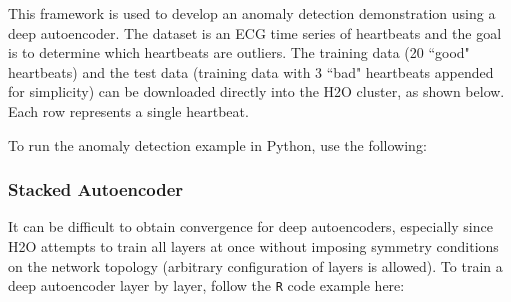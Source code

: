 {{This framework is used to develop an anomaly detection demonstration using a deep autoencoder. The dataset is an ECG time series of heartbeats and the goal is to determine which heartbeats are outliers. The training data (20 ``good" heartbeats) and the test data (training data with 3 ``bad" heartbeats appended for simplicity) can be downloaded directly into the H2O cluster, as shown below.  Each row represents a single heartbeat. 

%
%                              
%                              
%
%

\newpage
\waterExampleInR


\newpage

To run the anomaly detection example in Python, use the following:
 
\waterExampleInPython


\newpage
\subsubsection{Stacked Autoencoder}
It can be difficult to obtain convergence for deep autoencoders, especially since H2O attempts to train all layers at once without imposing symmetry conditions on the network topology (arbitrary configuration of layers is allowed). To train a deep autoencoder layer by layer, follow the \texttt{R} code example here:

}}
